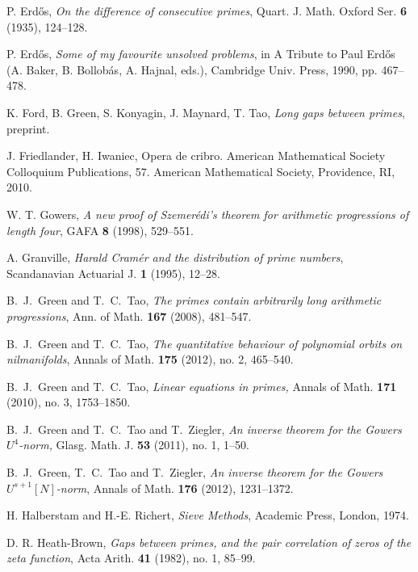 \documentclass[11pt]{amsart}
\numberwithin{equation}{section}  %
\theoremstyle{remark}
\theoremstyle{plain}
\numberwithin{equation}{section}
\renewcommand{\(}{\left(}
\renewcommand{\)}{\right)}
\begin{document}
\begin{thebibliography}{999}
 P. Erd\H{o}s, \emph{On the difference of consecutive primes}, Quart. J. Math. Oxford Ser. \textbf{6} (1935), 124--128.

 P. Erd\H os, {\it Some of my favourite unsolved problems}, in
A Tribute to Paul Erd\H os (A. Baker, B. Bollob\'as, A. Hajnal, eds.), Cambridge Univ. Press, 1990, pp. 467--478.

K. Ford, B. Green, S. Konyagin, J. Maynard, T. Tao, \emph{Long gaps between primes}, preprint.

J. Friedlander, H. Iwaniec, Opera de cribro. American Mathematical Society Colloquium Publications, 57. American Mathematical Society, Providence, RI, 2010.

W. T. Gowers, \emph{A new proof of Szemer\'edi's theorem for arithmetic progressions of length four}, GAFA \textbf{8} (1998), 529--551.

 A. Granville, \emph{Harald Cram\'er and the distribution of
prime numbers}, Scandanavian Actuarial J. \textbf{1}  (1995), 12--28.

 B.~J.~Green and T.~C.~Tao, \emph{The primes contain arbitrarily long arithmetic progressions}, Ann. of Math. \textbf{167} (2008), 481--547.

 B.~J.~Green and T.~C.~Tao, \emph{The quantitative behaviour of polynomial orbits on nilmanifolds}, Annals of Math. \textbf{175} (2012), no. 2, 465--540.

 B.~J.~Green and T.~C.~Tao, \emph{Linear equations in primes,} Annals of Math. \textbf{171} (2010), no. 3, 1753--1850.

 B.~J.~Green and T.~C.~Tao and T.~Ziegler, \emph{An inverse theorem for the Gowers $U^4$-norm,} Glasg. Math. J. \textbf{53} (2011), no. 1, 1--50. 

  B.~J.~Green, T.~C.~Tao and T.~Ziegler, 
\emph{An inverse theorem for the Gowers $U^{s+1}[N]$-norm},
Annals of Math. \textbf{176} (2012), 1231--1372.

 H. Halberstam and H.-E. Richert, \textit{Sieve Methods},
Academic Press, London, 1974.


D. R. Heath-Brown, \emph{Gaps between primes, and the pair correlation of zeros of the zeta function}, Acta Arith. \textbf{41} (1982), no. 1, 85--99.


\end{thebibliography}
\end{document}
